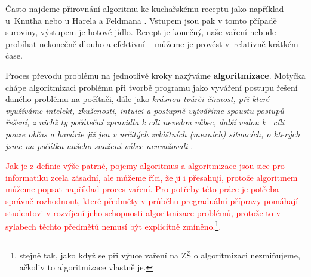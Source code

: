 \documentclass[FP,DP]{tulthesis}
\begin{document}
Často najdeme přirovnání algoritmu ke kuchařskému receptu jako například u~Knutha \citeyearpar[s.~6]{knuth} nebo u Harela a Feldmana  \citeyearpar[s.~4]{spirit}. Vstupem jsou pak v tomto případě suroviny, výstupem je hotové jídlo. Recept je konečný, naše vaření nebude probíhat nekonečně dlouho a efektivní -- můžeme je provést v~relativně krátkém čase.

 Proces převodu problému na jednotlivé kroky nazýváme \textbf{algoritmizace}.\citep*[s.~67]{didaktikderinformatik} Motyčka  chápe algoritmizaci problému při tvorbě programu jako  vyváření postupu řešení daného problému na počítači, dále jako \textit {krásnou tvůrči činnost, při které využíváme intelekt, zkušenosti, intuici a postupně vytváříme spoustu postupů řešení, z nichž ty počáteční zpravidla k cíli nevedou vůbec, další vedou k ~cíli pouze občas a havárie již jen v určitých zvláštních (mezních) situacích, o kterých jsme na počátku našeho snažení vůbec neuvažovali} \citeyearpar[s.~5]{motycka}.

\textcolor{red}{Jak je z definic výše patrné, pojemy algoritmus a algoritmizace jsou sice pro informatiku zcela zásadní, ale můžeme říci, že ji i přesahují, protože algoritmem můžeme popsat například proces vaření. Pro potřeby této práce je potřeba správně rozhodnout, které předměty v průběhu pregraduální přípravy pomáhají studentovi v rozvíjení jeho schopnosti algoritmizace problémů, protože to v sylabech těchto předmětů nemusí být explicitně zmíněno.\footnote{stejně tak, jako když se při výuce vaření na ZŠ o algoritmizaci nezmiňujeme, ačkoliv to algoritmizace vlastně je.}.  }



\end{document}
